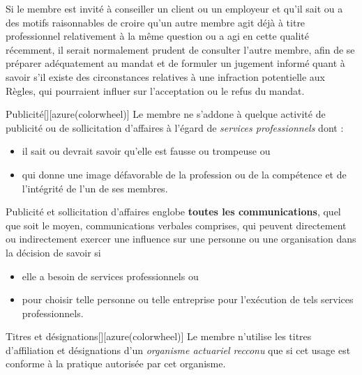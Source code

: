 \documentclass[10pt, french]{article}
\begin{document}
\begin{multicols*}{2}
\begin{definitionNOHFILLsub}[Annotation 8-3]
Si le membre est invité à conseiller un client ou un employeur et qu’il sait ou a des motifs raisonnables de croire qu’un autre membre agit déjà à titre professionnel relativement à la même question ou a agi en cette qualité récemment, il serait normalement prudent de consulter l’autre membre, afin de se préparer adéquatement au mandat et de formuler un jugement informé quant à savoir s’il existe des circonstances relatives à une infraction potentielle aux Règles, qui pourraient influer sur l’acceptation ou le refus du mandat.
\end{definitionNOHFILLsub}

\bigskip

\begin{definitionGENERAL}{Publicité}[][azure(colorwheel)]
Le membre ne s'addone à quelque activité de publicité ou de sollicitation d'affaires à l'égard de \og \textit{services professionnels} \fg{} dont : 
\begin{itemize}
	\item	il sait ou devrait savoir qu'elle est fausse ou trompeuse ou 
	\item	qui donne une image défavorable de la profession ou de la compétence et de l'intégrité de l'un de ses membres.
\end{itemize}
\end{definitionGENERAL}

\begin{definitionNOHFILLsub}[Annotation 9-1]
\og Publicité et sollicitation d’affaires \fg{} englobe \textbf{toutes les communications}, quel que soit le moyen, communications verbales comprises, qui peuvent directement ou indirectement exercer une influence sur une personne ou une organisation dans la décision de savoir si 
\begin{itemize}
	\item	elle a besoin de services professionnels ou
	\item	pour choisir telle personne ou telle entreprise pour l’exécution de tels services professionnels.
\end{itemize}
\end{definitionNOHFILLsub}

\bigskip

\begin{definitionGENERAL}{Titres et désignations}[][azure(colorwheel)]
Le membre n'utilise les titres d'affiliation et désignations d'un \og \textit{organisme actuariel recconu} \fg{}  que si cet usage est conforme à la pratique autorisée par cet organisme.


\end{definitionGENERAL}
\end{multicols*}
\end{document}
